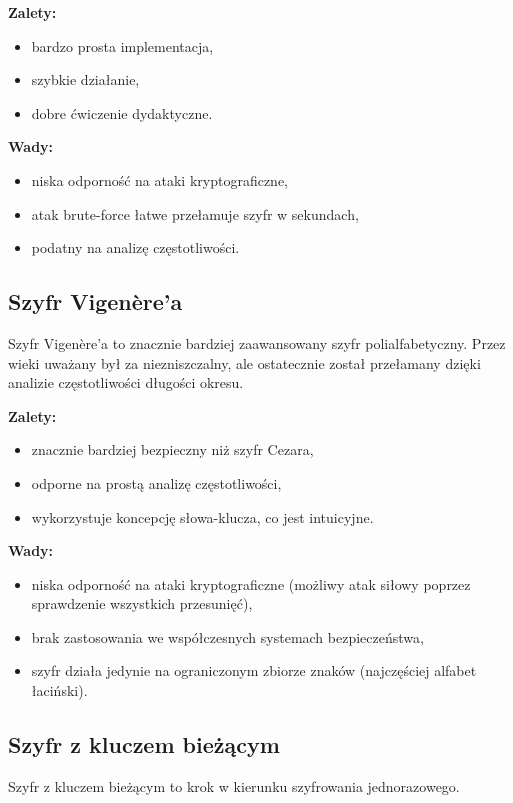 \documentclass[12pt,a4paper]{article}
\begin{document}
\textbf{Zalety:}
\begin{itemize}
    \item bardzo prosta implementacja,
    \item szybkie działanie,
    \item dobre ćwiczenie dydaktyczne.
\end{itemize}

\textbf{Wady:}
\begin{itemize}
    \item niska odporność na ataki kryptograficzne,
    \item atak brute-force łatwe przełamuje szyfr w sekundach,
    \item podatny na analizę częstotliwości.
\end{itemize}

\subsection{Szyfr Vigenère'a}
Szyfr Vigenère'a to znacznie bardziej zaawansowany szyfr polialfabetyczny. 
Przez wieki uważany był za niezniszczalny, 
ale ostatecznie został przełamany dzięki analizie częstotliwości długości okresu.

\textbf{Zalety:}
\begin{itemize}
    \item znacznie bardziej bezpieczny niż szyfr Cezara,
    \item odporne na prostą analizę częstotliwości,
    \item wykorzystuje koncepcję słowa-klucza, co jest intuicyjne.
\end{itemize}

\textbf{Wady:}
\begin{itemize}
    \item niska odporność na ataki kryptograficzne (możliwy atak siłowy poprzez sprawdzenie wszystkich przesunięć),
    \item brak zastosowania we współczesnych systemach bezpieczeństwa,
    \item szyfr działa jedynie na ograniczonym zbiorze znaków (najczęściej alfabet łaciński).
\end{itemize}

\newpage
\subsection{Szyfr z kluczem bieżącym}
Szyfr z kluczem bieżącym to krok w kierunku szyfrowania jednorazowego.
\end{document}
